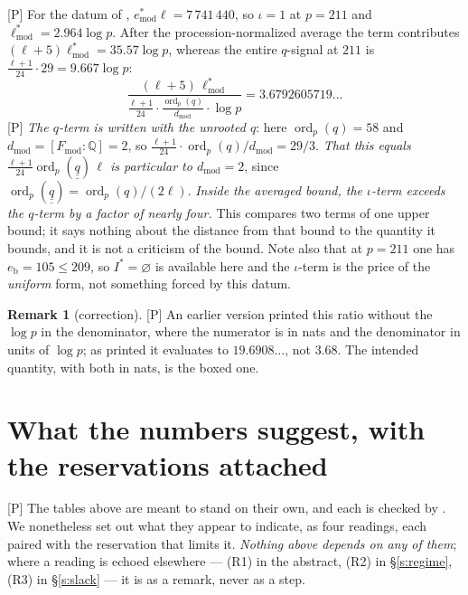 \documentclass[11pt]{article}
\theoremstyle{plain}
\theoremstyle{definition}
\newtheorem{remark}{Remark}
\newcommand{\Fmod}{F_{\mathrm{mod}}}
\newcommand{\ord}{\operatorname{ord}}
\newcommand{\qbb}{\underline{\underline q}}
\begin{document}
\textup{[P]} For the datum of \cite{First}, $e^{*}_{\mathrm{mod}}\ell=7\,741\,440$, so
$\iota=1$ at $p=211$ and $\ell^{*}_{\mathrm{mod}}=2.964\log p$.  After the
procession-normalized average the term contributes $(\ell+5)\ell^{*}_{\mathrm{mod}}
=35.57\log p$, whereas the entire $q$-signal at $211$ is
$\tfrac{\ell+1}{24}\cdot29=9.667\log p$:
\[
 \boxed{\ \frac{(\ell+5)\,\ell^{*}_{\mathrm{mod}}}
   {\frac{\ell+1}{24}\cdot\frac{\ord_p(q)}{d_{\mathrm{mod}}}\cdot\log p}
 =3.6792605719\ldots\ }
\]
\textup{[P]} \emph{The $q$-term is written with the unrooted $q$}: here
$\ord_p(q)=58$ and $d_{\mathrm{mod}}=[\Fmod:\mathbb{Q}]=2$, so
$\tfrac{\ell+1}{24}\cdot\ord_p(q)/d_{\mathrm{mod}}=29/3$.  \emph{That this equals
$\tfrac{\ell+1}{24}\ord_p(\qbb)\,\ell$ is particular to $d_{\mathrm{mod}}=2$}, since
$\ord_p(\qbb)=\ord_p(q)/(2\ell)$.  \emph{Inside the averaged bound, the $\iota$-term
exceeds the $q$-term by a factor of nearly four.}  This compares two terms of one upper bound; it says nothing
about the distance from that bound to the quantity it bounds, and it is not a criticism
of the bound.  Note also that at $p=211$ one has $e_{\mathrm b}=105\le209$, so
$I^{*}=\varnothing$ is available here and the $\iota$-term is the price of the
\emph{uniform} form, not something forced by this datum.

\begin{remark}[correction]\label{r:box}
\textup{[P]} An earlier version printed this ratio without the $\log p$ in the
denominator, where the numerator is in nats and the denominator in units of $\log p$;
as printed it evaluates to $19.6908\ldots$, not $3.68$.  The intended quantity, with
both in nats, is the boxed one.
\end{remark}

\section{What the numbers suggest, with the reservations attached}\label{s:interp}

\textup{[P]} The tables above are meant to stand on their own, and each is checked by
.  We nonetheless set out what they appear to indicate, as
four readings, each paired with the reservation that limits it.  \emph{Nothing above depends on any of them}; where a
reading is echoed elsewhere --- (R1) in the abstract, (R2) in \S\ref{s:regime}, (R3) in
\S\ref{s:slack} --- it is as a remark, never as a step.
\end{document}
